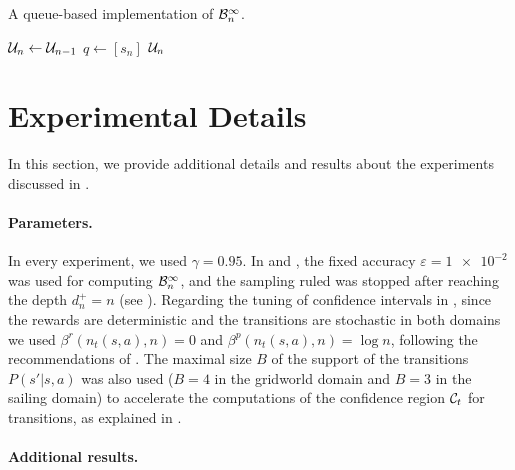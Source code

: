 \documentclass[runningheads]{llncs}
\begin{document}
\begin{algorithm}
	\caption{A queue-based implementation of $\mathcal{B}_n^\infty$.}
	\label{alg:queue-b-inf}
	\DontPrintSemicolon
	$\mathcal{U}_n \gets \mathcal{U}_{n-1}$\;
	$q\gets [s_n]$\;
	\Return $\mathcal{U}_n$\;
\end{algorithm}

\section{Experimental Details}
\label{sec:experimental-details}

In this section, we provide additional details and results about the experiments discussed in .

\paragraph{Parameters.} In every experiment, we used $\gamma=0.95$. In \GBOPD and \GBOP, the fixed accuracy $\varepsilon=\num{1e-2}$ was used for computing $\mathcal{B}_n^\infty$, and the sampling ruled was stopped after reaching the depth $d^+_n = n$ (see ).
Regarding the tuning of confidence intervals in \GBOP, since the rewards are deterministic and the transitions are stochastic in both domains we used $\beta^r(n_t(s,a), n) = 0$ and $\beta^p(n_t(s,a), n) = \log n$, following the recommendations of \citep{Leurent2019practical,MDPGapE2020}. The maximal size $B$ of the support of the transitions $P\left(s'|s,a\right)$ was also used ($B=4$ in the gridworld domain and $B=3$ in the sailing domain) to accelerate the computations of the confidence region $\mathcal{C}_t$ for transitions, as explained in \citep{MDPGapE2020}.

\paragraph{Additional results.}
\end{document}
